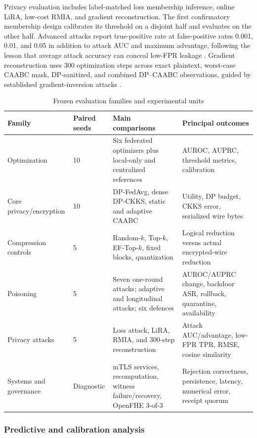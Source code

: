 Privacy evaluation includes label-matched loss membership inference, online LiRA, low-cost RMIA, and gradient reconstruction. The first confirmatory membership design calibrates its threshold on a disjoint half and evaluates on the other half. Advanced attacks report true-positive rate at false-positive rates 0.001, 0.01, and 0.05 in addition to attack AUC and maximum advantage, following the lesson that average attack accuracy can conceal low-FPR leakage \cite{carlini2022membership}. Gradient reconstruction uses 300 optimization steps across exact plaintext, worst-case CAABC mask, DP-sanitized, and combined DP--CAABC observations, guided by established gradient-inversion attacks \cite{zhu2019dlg,geiping2020inverting}.

\begin{table}[htbp]
\centering
\caption{Frozen evaluation families and experimental units}
\label{tab:evaluation-families}
\small
\begin{tabularx}{\textwidth}{@{}p{2.9cm}p{2.3cm}X X@{}}
\toprule
Family & Paired seeds & Main comparisons & Principal outcomes \\
\midrule
Optimization & 10 & Six federated optimizers plus local-only and centralized references & AUROC, AUPRC, threshold metrics, calibration \\
Core privacy/encryption & 10 & DP-FedAvg, dense DP-CKKS, static and adaptive CAABC & Utility, DP budget, CKKS error, serialized wire bytes \\
Compression controls & 5 & Random-$k$, Top-$k$, EF-Top-$k$, fixed blocks, quantization & Logical reduction versus actual encrypted-wire reduction \\
Poisoning & 5 & Seven one-round attacks; adaptive and longitudinal attacks; six defences & AUROC/AUPRC change, backdoor ASR, rollback, quarantine, availability \\
Privacy attacks & 5 & Loss attack, LiRA, RMIA, and 300-step reconstruction & Attack AUC/advantage, low-FPR TPR, RMSE, cosine similarity \\
Systems and governance & Diagnostic & mTLS services, recomputation, witness failure/recovery, OpenFHE 3-of-3 & Rejection correctness, persistence, latency, numerical error, receipt quorum \\
\bottomrule
\end{tabularx}
\end{table}

\subsubsection{Predictive and calibration analysis}


